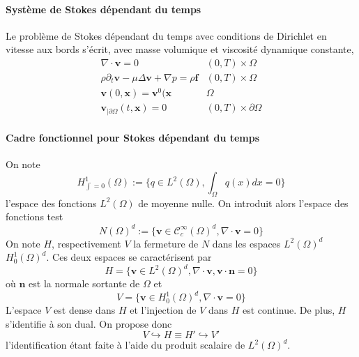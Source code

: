 \paragraph{Système de Stokes dépendant du temps} Le problème de Stokes dépendant du temps avec conditions de Dirichlet en vitesse aux bords s'écrit, avec masse volumique et viscosité dynamique constante,
\begin{align*}
    \nabla \cdot \mathbf{v} = 0 & (0,T) \times \Omega \\
    \rho \partial_t \mathbf{v} - \mu \Delta \mathbf{v} + \nabla p = \rho \mathbf{f} & (0,T) \times \Omega \\
    \mathbf{v}(0, \mathbf{x}) = \mathbf{v}^0(\mathbf{x} & \Omega \\
    \mathbf{v}_{|\partial \Omega}(t, \mathbf{x}) = 0 & (0,T) \times \partial \Omega
\end{align*}

\paragraph{Cadre fonctionnel pour Stokes dépendant du temps} On note $$ H^1_{\int = 0}(\Omega) := \{ q \in L^2(\Omega), \int_\Omega q(x) dx = 0 \} $$ l'espace des fonctions $L^2(\Omega)$ de moyenne nulle. On introduit alors l'espace des fonctions test $$ N(\Omega)^d := \{ \mathbf{v} \in \mathcal{C}^{\infty}_c(\Omega)^d, \nabla \cdot \mathbf{v} = 0 \} $$ On note $H$, respectivement $V$ la fermeture de $N$ dans les espaces $L^2(\Omega)^d$ $H^1_0(\Omega)^d$. Ces deux espaces se caractérisent par $$ H = \{ \mathbf{v} \in L^2(\Omega)^d, \nabla \cdot \mathbf{v}, \mathbf{v} \cdot \mathbf{n} = 0 \} $$ où $\mathbf{n}$ est la normale sortante de $\Omega$ et $$ V = \{ \mathbf{v} \in H^1_0(\Omega)^d, \nabla \cdot \mathbf{v} = 0 \} $$
L'espace $V$ est dense dans $H$ et l'injection de $V$ dans $H$ est continue. De plus, $H$ s'identifie à son dual. On propose donc $$ V \hookrightarrow H \equiv H' \hookrightarrow V' $$ l'identification étant faite à l'aide du produit scalaire de $L^2(\Omega)^d$.

